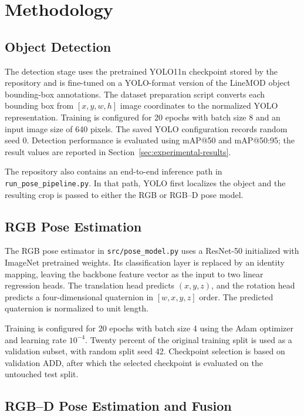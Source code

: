 \documentclass[11pt,a4paper]{article}
\begin{document}
\section{Methodology}

\subsection{Object Detection}

The detection stage uses the pretrained YOLO11n checkpoint stored by the
repository and is fine-tuned on a YOLO-format version of the LineMOD object
bounding-box annotations. The dataset preparation script converts each
bounding box from $[x,y,w,h]$ image coordinates to the normalized YOLO
representation. Training is configured for 20 epochs with batch size 8 and an
input image size of 640 pixels. The saved YOLO configuration records random
seed 0. Detection performance is evaluated using mAP@50 and mAP@50:95; the
result values are reported in Section~\ref{sec:experimental-results}.

The repository also contains an end-to-end inference path in
\texttt{run\_pose\_pipeline.py}. In that path, YOLO first localizes the object
and the resulting crop is passed to either the RGB or RGB--D pose model.

\subsection{RGB Pose Estimation}

The RGB pose estimator in \texttt{src/pose\_model.py} uses a ResNet-50
initialized with ImageNet pretrained weights. Its classification layer is
replaced by an identity mapping, leaving the backbone feature vector as the
input to two linear regression heads. The translation head predicts
$(x,y,z)$, and the rotation head predicts a four-dimensional quaternion in
$[w,x,y,z]$ order. The predicted quaternion is normalized to unit length.

Training is configured for 20 epochs with batch size 4 using the Adam
optimizer and learning rate $10^{-4}$. Twenty percent of the original
training split is used as a validation subset, with random split seed 42.
Checkpoint selection is based on validation ADD, after which the selected
checkpoint is evaluated on the untouched test split.

\subsection{RGB--D Pose Estimation and Fusion}
\end{document}
